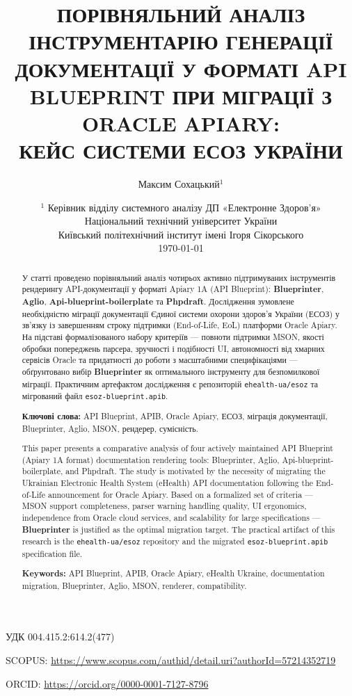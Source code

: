 \documentclass{article}
\begin{document}
\title{ПОРІВНЯЛЬНИЙ АНАЛІЗ ІНСТРУМЕНТАРІЮ ГЕНЕРАЦІЇ ДОКУМЕНТАЦІЇ У ФОРМАТІ API BLUEPRINT ПРИ МІГРАЦІЇ З ORACLE APIARY: \\ КЕЙС СИСТЕМИ ЕСОЗ УКРАЇНИ}
\author{Максим Сохацький$^1$}
\date{%
$^1$ Керівник відділу системного аналізу ДП «Електронне Здоров'я»\\[0.3em]
Національний технічний університет України \\
\small Київський політехнічний інститут імені Ігоря Сікорського \\
\today
}
\maketitle

УДК 004.415.2:614.2(477)

SCOPUS: \url{https://www.scopus.com/authid/detail.uri?authorId=57214352719}

ORCID: \url{https://orcid.org/0000-0001-7127-8796}

\begin{abstract}
У статті проведено порівняльний аналіз чотирьох активно підтримуваних інструментів рендерингу API-документації у форматі Apiary 1A (API Blueprint): \textbf{Blueprinter}, \textbf{Aglio}, \textbf{Api-blueprint-boilerplate} та \textbf{Phpdraft}. Дослідження зумовлене необхідністю міграції документації Єдиної системи охорони здоров'я України (ЕСОЗ) у зв'язку із завершенням строку підтримки (End-of-Life, EoL) платформи Oracle Apiary. На підставі формалізованого набору критеріїв — повноти підтримки MSON, якості обробки попереджень парсера, зручності і подібності UI, автономності від хмарних сервісів Oracle та придатності до роботи з масштабними специфікаціями — обґрунтовано вибір \textbf{Blueprinter} як оптимального інструменту для безпомилкової міграції. Практичним артефактом дослідження є репозиторій \texttt{ehealth-ua/esoz} та мігрований файл \texttt{esoz-blueprint.apib}.

\textbf{Ключові слова:} API Blueprint, APIB, Oracle Apiary, ЕСОЗ, міграція документації, Blueprinter, Aglio, MSON, рендерер, сумісність.
\end{abstract}

\begin{abstract}
This paper presents a comparative analysis of four actively maintained API Blueprint (Apiary 1A format) documentation rendering tools: Blueprinter, Aglio, Api-blueprint-boilerplate, and Phpdraft. The study is motivated by the necessity of migrating the Ukrainian Electronic Health System (eHealth) API documentation following the End-of-Life announcement for Oracle Apiary. Based on a formalized set of criteria — MSON support completeness, parser warning handling quality, UI ergonomics, independence from Oracle cloud services, and scalability for large specifications — \textbf{Blueprinter} is justified as the optimal migration target. The practical artifact of this research is the \texttt{ehealth-ua/esoz} repository and the migrated \texttt{esoz-blueprint.apib} specification file.

\textbf{Keywords:} API Blueprint, APIB, Oracle Apiary, eHealth Ukraine, documentation migration, Blueprinter, Aglio, MSON, renderer, compatibility.
\end{abstract}
\end{document}
